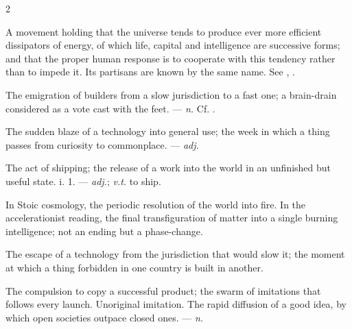 \begin{multicols}{2}

 A movement holding that the universe tends to produce ever more efficient dissipators of energy, of which life, capital and intelligence are successive forms; and that the proper human response is to cooperate with this tendency rather than to impede it. Its partisans are known by the same name. See , .

 The emigration of builders from a slow jurisdiction to a fast one; a brain-drain considered as a vote cast with the feet.   —  \textit{n.} Cf. .

 The sudden blaze of a technology into general use; the week in which a thing passes from curiosity to commonplace.  —  \textit{adj.}

 The act of shipping; the release of a work into the world in an unfinished but useful state.   i. 1. —  \textit{adj.};  \textit{v.t.} to ship.

  In Stoic cosmology, the periodic resolution of the world into fire.   In the accelerationist reading, the final transfiguration of matter into a single burning intelligence; not an ending but a phase-change.

 The escape of a technology from the jurisdiction that would slow it; the moment at which a thing forbidden in one country is built in another. 

 The compulsion to copy a successful product; the swarm of imitations that follows every launch.   Unoriginal imitation.   The rapid diffusion of a good idea, by which open societies outpace closed ones. —  \textit{n.}


\end{multicols}
